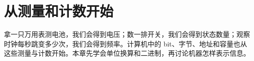 \chapter{从测量和计数开始}

拿一只万用表测电池，我们会得到电压；数一排开关，我们会得到状态数量；观察
时钟每秒跳变多少次，我们会得到频率。计算机中的 bit、字节、地址和容量也从
这些测量与计数开始。本章先学会单位换算和二进制，再讨论机器怎样表示信息。


